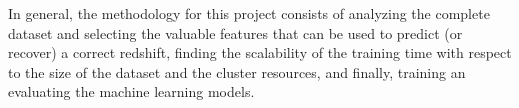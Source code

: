 In general, the methodology for this project consists of analyzing the complete dataset and selecting the valuable features that can be used to predict (or recover) a correct redshift, finding the scalability of the training time with respect to the size of the dataset and the cluster resources, and finally, training an evaluating the machine learning models. 